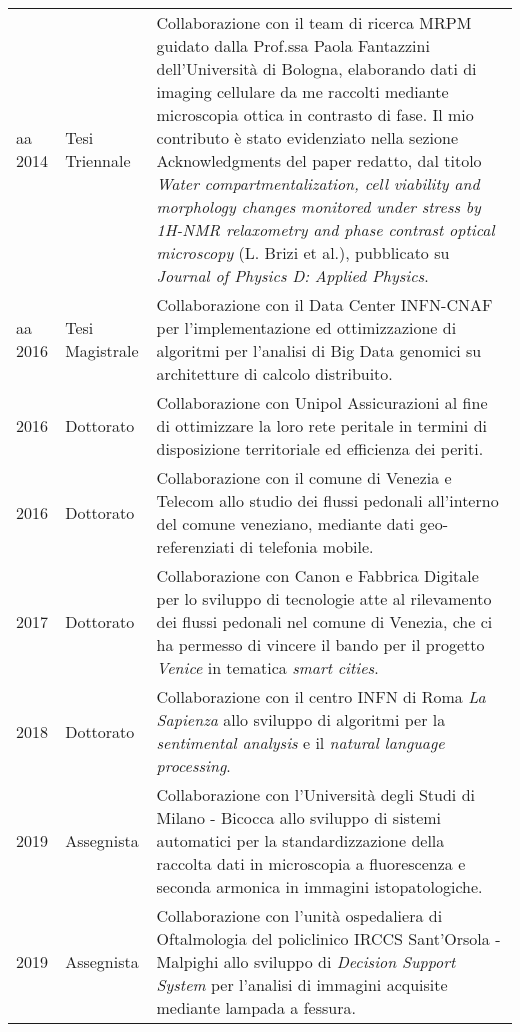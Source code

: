\documentclass[a4paper,11pt]{article}
\begin{document}
\begin{tabular}{llp{12cm}}

  aa 2014             & Tesi Triennale  & Collaborazione con il team di ricerca MRPM guidato dalla Prof.ssa Paola Fantazzini dell'Università di Bologna, elaborando dati di imaging cellulare da me raccolti mediante microscopia ottica in contrasto di fase. Il mio contributo è stato evidenziato nella sezione Acknowledgments del paper redatto, dal titolo \emph{Water compartmentalization, cell viability and morphology changes monitored under stress by 1H-NMR relaxometry and phase contrast optical microscopy} (L. Brizi et al.), pubblicato su \emph{Journal of Physics D: Applied Physics}. \\
  aa 2016             & Tesi Magistrale & Collaborazione con il Data Center INFN-CNAF per l'implementazione ed ottimizzazione di algoritmi per l'analisi di Big Data genomici su architetture di calcolo distribuito.\\
  2016\textemdash2017 & Dottorato       & Collaborazione con Unipol Assicurazioni al fine di ottimizzare la loro rete peritale in termini di disposizione territoriale ed efficienza dei periti.\\
  2016\textemdash2017 & Dottorato       & Collaborazione con il comune di Venezia e Telecom allo studio dei flussi pedonali all'interno del comune veneziano, mediante dati geo-referenziati di telefonia mobile. \\
  2017\textemdash2018 & Dottorato       & Collaborazione con Canon e Fabbrica Digitale per lo sviluppo di tecnologie atte al rilevamento dei flussi pedonali nel comune di Venezia, che ci ha permesso di vincere il bando per il progetto \emph{Venice} in tematica \emph{smart cities}. \\
  2018\textemdash2019 & Dottorato       & Collaborazione con il centro INFN di Roma \emph{La Sapienza} allo sviluppo di algoritmi per la \emph{sentimental analysis} e il \emph{natural language processing}.\\
  2019                & Assegnista      & Collaborazione con l'Università degli Studi di Milano - Bicocca allo sviluppo di sistemi automatici per la standardizzazione della raccolta dati in microscopia a fluorescenza e seconda armonica in immagini istopatologiche.\\
  2019                & Assegnista      & Collaborazione con l'unità ospedaliera di Oftalmologia del policlinico IRCCS Sant'Orsola - Malpighi allo sviluppo di \emph{Decision Support System} per l'analisi di immagini acquisite mediante lampada a fessura.\\

\end{tabular}
\end{document}
